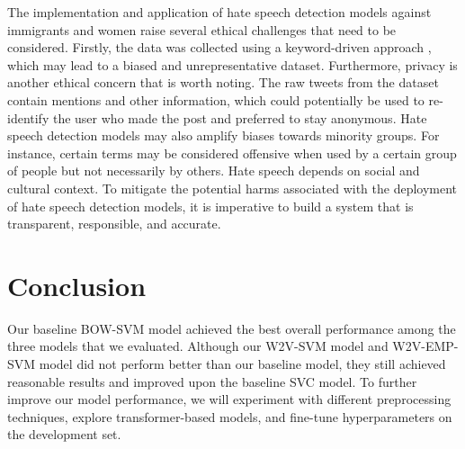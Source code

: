 \documentclass[11pt,a4paper]{article}
\begin{document}
   The implementation and application of hate speech detection models against immigrants and women raise several ethical challenges that need to be considered. Firstly, the data was collected using a keyword-driven approach \citep{basile-etal-2019-semeval}, which may lead to a biased and unrepresentative dataset. Furthermore, privacy is another ethical concern that is worth noting. The raw tweets from the dataset contain mentions and other information, which could potentially be used to re-identify the user who made the post and preferred to stay anonymous. Hate speech detection models may also amplify biases towards minority groups. For instance, certain terms may be considered offensive when used by a certain group of people but not necessarily by others. Hate speech depends on social and cultural context. To mitigate the potential harms associated with the deployment of hate speech detection models, it is imperative to build a system that is transparent, responsible, and accurate.


\section{Conclusion}

 Our baseline BOW-SVM model achieved the best overall performance among the three models that we evaluated. Although our W2V-SVM model and W2V-EMP-SVM model did not perform better than our baseline model, they still achieved reasonable results and improved upon the \citet{basile-etal-2019-semeval} baseline SVC model. To further improve our model performance, we will experiment with different preprocessing techniques, explore transformer-based models, and fine-tune hyperparameters on the development set.


\nocite{*}


\end{document}
